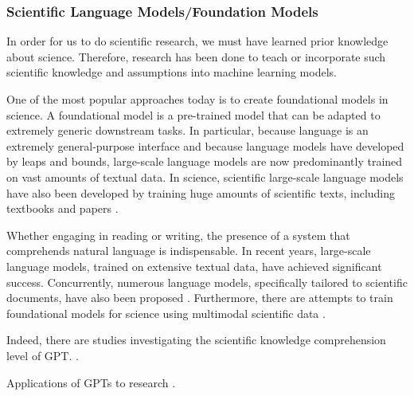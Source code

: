 \subsubsection{Scientific Language Models/Foundation Models}
In order for us to do scientific research, we must have learned prior knowledge about science. Therefore, research has been done to teach or incorporate such scientific knowledge and assumptions into machine learning models.

One of the most popular approaches today is to create foundational models in science. A foundational model is a pre-trained model that can be adapted to extremely generic downstream tasks. In particular, because language is an extremely general-purpose interface and because language models have developed by leaps and bounds, large-scale language models are now predominantly trained on vast amounts of textual data. In science, scientific large-scale language models have also been developed by training huge amounts of scientific texts, including textbooks and papers \cite{taylor2022galactica}.


Whether engaging in reading or writing, the presence of a system that comprehends natural language is indispensable. In recent years, large-scale language models, trained on extensive textual data, have achieved significant success. Concurrently, numerous language models, specifically tailored to scientific documents, have also been proposed \cite{beltagy2019scibert,singh2022scirepeval,nadkarni2021scientific,cohan2020specter,gupta2022matscibert,taylor2022galactica}. Furthermore, there are attempts to train foundational models for science using multimodal scientific data \cite{singhal2023towards,takeda2023foundation,nguyen2023climax}.

Indeed, there are studies investigating the scientific knowledge comprehension level of GPT.
\cite{bordt2023chatgpt}.

Applications of GPTs to research \cite{wang2023survey}.

